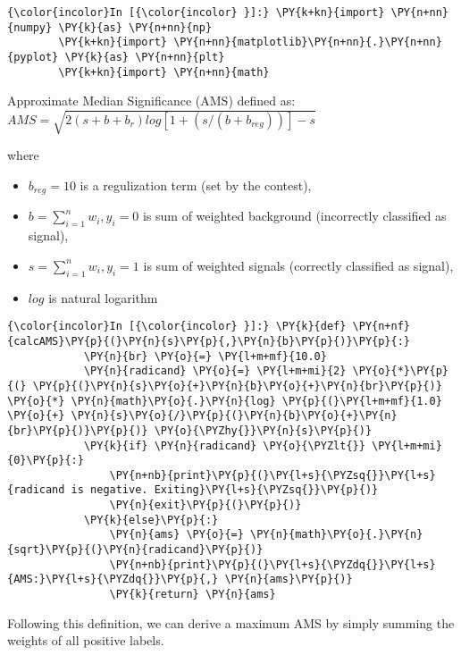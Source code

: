\begin{Verbatim}[commandchars=\\\{\}]
{\color{incolor}In [{\color{incolor} }]:} \PY{k+kn}{import} \PY{n+nn}{numpy} \PY{k}{as} \PY{n+nn}{np}
        \PY{k+kn}{import} \PY{n+nn}{matplotlib}\PY{n+nn}{.}\PY{n+nn}{pyplot} \PY{k}{as} \PY{n+nn}{plt}
        \PY{k+kn}{import} \PY{n+nn}{math}
\end{Verbatim}

    Approximate Median Significance (AMS) defined as:
\(AMS = \sqrt{2 { (s + b + b_r) log[1 + (s/(b+b_{reg}))] - s}}\)

where

\begin{itemize}
\tightlist
\item
  \(b_{reg} = 10\) is a regulization term (set by the contest),
\item
  \(b = \sum_{i=1}^{n} w_i, y_i=0\) is sum of weighted background
  (incorrectly classified as signal),
\item
  \(s = \sum_{i=1}^{n} w_i, y_i=1\) is sum of weighted signals
  (correctly classified as signal),
\item
  \(log\) is natural logarithm
\end{itemize}

    \begin{Verbatim}[commandchars=\\\{\}]
{\color{incolor}In [{\color{incolor} }]:} \PY{k}{def} \PY{n+nf}{calcAMS}\PY{p}{(}\PY{n}{s}\PY{p}{,}\PY{n}{b}\PY{p}{)}\PY{p}{:}    
            \PY{n}{br} \PY{o}{=} \PY{l+m+mf}{10.0}
            \PY{n}{radicand} \PY{o}{=} \PY{l+m+mi}{2} \PY{o}{*}\PY{p}{(} \PY{p}{(}\PY{n}{s}\PY{o}{+}\PY{n}{b}\PY{o}{+}\PY{n}{br}\PY{p}{)} \PY{o}{*} \PY{n}{math}\PY{o}{.}\PY{n}{log} \PY{p}{(}\PY{l+m+mf}{1.0} \PY{o}{+} \PY{n}{s}\PY{o}{/}\PY{p}{(}\PY{n}{b}\PY{o}{+}\PY{n}{br}\PY{p}{)}\PY{p}{)} \PY{o}{\PYZhy{}}\PY{n}{s}\PY{p}{)}
            \PY{k}{if} \PY{n}{radicand} \PY{o}{\PYZlt{}} \PY{l+m+mi}{0}\PY{p}{:}
                \PY{n+nb}{print}\PY{p}{(}\PY{l+s}{\PYZsq{}}\PY{l+s}{radicand is negative. Exiting}\PY{l+s}{\PYZsq{}}\PY{p}{)}
                \PY{n}{exit}\PY{p}{(}\PY{p}{)}
            \PY{k}{else}\PY{p}{:}
                \PY{n}{ams} \PY{o}{=} \PY{n}{math}\PY{o}{.}\PY{n}{sqrt}\PY{p}{(}\PY{n}{radicand}\PY{p}{)}
                \PY{n+nb}{print}\PY{p}{(}\PY{l+s}{\PYZdq{}}\PY{l+s}{AMS:}\PY{l+s}{\PYZdq{}}\PY{p}{,} \PY{n}{ams}\PY{p}{)}
                \PY{k}{return} \PY{n}{ams}
\end{Verbatim}

    Following this definition, we can derive a maximum AMS by simply summing
the weights of all positive labels.


